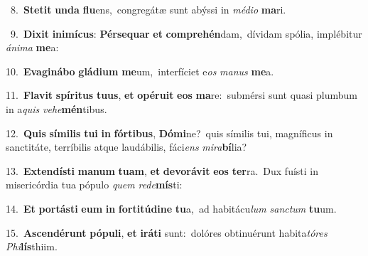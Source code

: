 {{\numbfont\textcolor{\numbcolor}{~8.}}~\-\textbf{Ste}\-\textbf{tit} \textbf{un}\-\textbf{da} \textbf{flu}\-ens,~\star congregátæ sunt abýssi in \textit{mé}\-\textit{di}\textit{o} \textbf{ma}\-ri.\par
{\numbfont\textcolor{\numbcolor}{~9.}}~\-\textbf{Di}\-\textbf{xit} \textbf{in}\-\textbf{i}\textbf{mí}\textbf{cus}: \textbf{Pér}\-\textbf{se}\textbf{quar} \textbf{et} \textbf{com}\-\textbf{pre}\textbf{hén}dam,~\star dívidam spólia, implébitur \textit{á}\-\textit{ni}\textit{ma} \textbf{me}\-a:\par
{\numbfont\textcolor{\numbcolor}{10.}}~\-\textbf{E}\-\textbf{va}\textbf{gi}\textbf{ná}\textbf{bo} \textbf{glá}\-\textbf{di}\textbf{um} \textbf{me}\-um,~\star interfíciet e\textit{os} \textit{ma}\-\textit{nus} \textbf{me}\-a.\par
{\numbfont\textcolor{\numbcolor}{11.}}~\-\textbf{Fla}\-\textbf{vit} \textbf{spí}\-\textbf{ri}\textbf{tus} \textbf{tu}\-\textbf{us}, \textbf{et} \textbf{o}\-\textbf{pé}\textbf{ru}\textbf{it} \textbf{e}\-\textbf{os} \textbf{ma}\-re:~\star submérsi sunt quasi plumbum in a\textit{quis} \textit{ve}\-\textit{he}\textbf{mén}tibus.\par
{\numbfont\textcolor{\numbcolor}{12.}}~\textbf{Quis} \textbf{sí}\-\textbf{mi}\textbf{lis} \textbf{tu}\-\textbf{i} \textbf{in} \textbf{fór}\-\textbf{ti}\textbf{bus}, \textbf{Dó}\-\textbf{mi}ne?~\star quis símilis tui, magníficus in sanctitáte, terríbilis atque laudábilis, fáci\textit{ens} \textit{mi}\-\textit{ra}\textbf{bí}lia?\par
{\numbfont\textcolor{\numbcolor}{13.}}~\-\textbf{Ex}\-\textbf{ten}\textbf{dís}\textbf{ti} \textbf{ma}\-\textbf{num} \textbf{tu}\-\textbf{am}, \textbf{et} \textbf{de}\-\textbf{vo}\textbf{rá}\textbf{vit} \textbf{e}\-\textbf{os} \textbf{ter}\-ra.~\star Dux fuísti in misericórdia tua pópulo \textit{quem} \textit{red}\-\textit{e}\textbf{mís}ti:\par
{\numbfont\textcolor{\numbcolor}{14.}}~\textbf{Et} \textbf{por}\-\textbf{tás}\textbf{ti} \textbf{e}\-\textbf{um} \textbf{in} \textbf{for}\-\textbf{ti}\textbf{tú}\textbf{di}\textbf{ne} \textbf{tu}\-a,~\star ad habitácu\textit{lum} \textit{sanc}\-\textit{tum} \textbf{tu}\-um.\par
{\numbfont\textcolor{\numbcolor}{15.}}~\-\textbf{A}\-\textbf{scen}\textbf{dé}\textbf{runt} \textbf{pó}\-\textbf{pu}\textbf{li}, \textbf{et} \textbf{i}\-\textbf{rá}\textbf{ti} sunt:~\star dolóres obtinuérunt habita\-\textit{tó}\-\textit{res} \textit{Phi}\-\textbf{lís}thiim.\par
}

